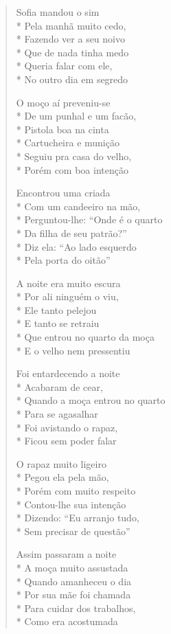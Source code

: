 \begin{verse}
Sofia mandou o sim\\*
Pela manhã muito cedo,\\*
Fazendo ver a seu noivo\\*
Que de nada tinha medo\\*
Queria falar com ele,\\*
No outro dia em segredo

O moço aí preveniu-se\\*
De um punhal e um facão,\\*
Pistola boa na cinta\\*
Cartucheira e munição\\*
Seguiu pra casa do velho,\\*
Porém com boa intenção

Encontrou uma criada\\*
Com um candeeiro na mão,\\*
Perguntou-lhe: ``Onde é o quarto\\*
Da filha de seu patrão?''\\*
Diz ela: ``Ao lado esquerdo\\*
Pela porta do oitão''

A noite era muito escura\\*
Por ali ninguém o viu,\\*
Ele tanto pelejou\\*
E tanto se retraiu\\*
Que entrou no quarto da moça\\*
E o velho nem pressentiu

Foi entardecendo a noite\\*
Acabaram de cear,\\*
Quando a moça entrou no quarto\\*
Para se agasalhar\\*
Foi avistando o rapaz,\\*
Ficou sem poder falar

O rapaz muito ligeiro\\*
Pegou ela pela mão,\\*
Porém com muito respeito\\*
Contou-lhe sua intenção\\*
Dizendo: ``Eu arranjo tudo,\\*
Sem precisar de questão''

Assim passaram a noite\\*
A moça muito assustada\\*
Quando amanheceu o dia\\*
Por sua mãe foi chamada\\*
Para cuidar dos trabalhos,\\*
Como era acostumada


\end{verse}
